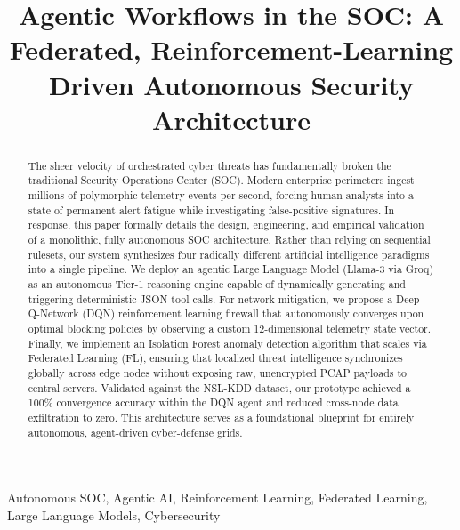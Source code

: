 \documentclass[conference]{IEEEtran}
\begin{document}
\title{Agentic Workflows in the SOC: A Federated, Reinforcement-Learning Driven Autonomous Security Architecture
}

\author{
}

\maketitle

\begin{abstract}
The sheer velocity of orchestrated cyber threats has fundamentally broken the traditional Security Operations Center (SOC). Modern enterprise perimeters ingest millions of polymorphic telemetry events per second, forcing human analysts into a state of permanent alert fatigue while investigating false-positive signatures. In response, this paper formally details the design, engineering, and empirical validation of a monolithic, fully autonomous SOC architecture. Rather than relying on sequential rulesets, our system synthesizes four radically different artificial intelligence paradigms into a single pipeline. We deploy an agentic Large Language Model (Llama-3 via Groq) as an autonomous Tier-1 reasoning engine capable of dynamically generating and triggering deterministic JSON tool-calls. For network mitigation, we propose a Deep Q-Network (DQN) reinforcement learning firewall that autonomously converges upon optimal blocking policies by observing a custom 12-dimensional telemetry state vector. Finally, we implement an Isolation Forest anomaly detection algorithm that scales via Federated Learning (FL), ensuring that localized threat intelligence synchronizes globally across edge nodes without exposing raw, unencrypted PCAP payloads to central servers. Validated against the NSL-KDD dataset, our prototype achieved a 100\% convergence accuracy within the DQN agent and reduced cross-node data exfiltration to zero. This architecture serves as a foundational blueprint for entirely autonomous, agent-driven cyber-defense grids.
\end{abstract}

\begin{IEEEkeywords}
Autonomous SOC, Agentic AI, Reinforcement Learning, Federated Learning, Large Language Models, Cybersecurity
\end{IEEEkeywords}
\end{document}
